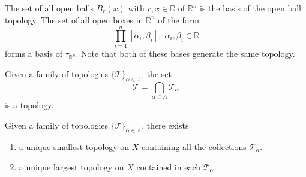       \begin{example}
        The set of all open balls $B_r (x)$ with $r, x \in \mathbb{R}$ of $\mathbb{R}^n$ is the basis of the open ball topology. The set of all open boxes in $\mathbb{R}^{n}$ of the form 
        \begin{equation}
          \prod_{i=1}^n [\alpha_i, \beta_i], \; \alpha_i, \beta_i \in \mathbb{R} 
        \end{equation}
        forms a basis of $\tau_{\mathbb{R}^{n}}$. Note that both of these bases generate the same topology. 
      \end{example} 

      \begin{theorem}
        Given a family of topologies $\{\mathscr{T}\}_{\alpha \in A}$, the set 
        \begin{equation}
          \mathscr{T} = \bigcap_{\alpha \in A} \mathscr{T}_\alpha
        \end{equation}
        is a topology. 
      \end{theorem}

      \begin{corollary}
        Given a family of topologies $\{\mathscr{T}\}_{\alpha \in A}$, there exists 
        \begin{enumerate}
          \item a unique smallest topology on $X$ containing all the collections $\mathscr{T}_\alpha$. 
          \item a unique largest topology on $X$ contained in each $\mathscr{T}_\alpha$. 
        \end{enumerate}
      \end{corollary} 

